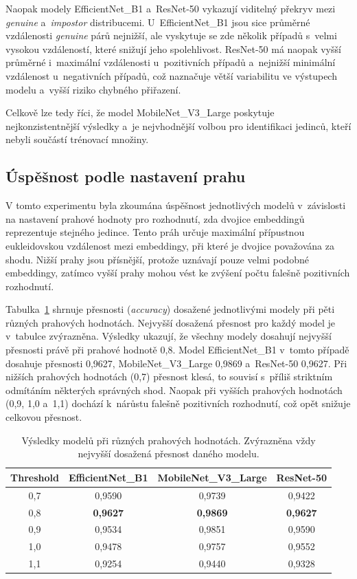 Naopak modely EfficientNet\_B1 a~ResNet-50 vykazují viditelný překryv mezi \textit{genuine} a~\textit{impostor} distribucemi. U~EfficientNet\_B1 jsou sice průměrné vzdálenosti \textit{genuine} párů nejnižší, ale vyskytuje se zde několik případů s~velmi vysokou vzdáleností, které snižují jeho spolehlivost. ResNet-50 má naopak vyšší průměrné i~maximální vzdálenosti u~pozitivních případů a~nejnižší minimální vzdálenost u~negativních případů, což naznačuje větší variabilitu ve výstupech modelu a~vyšší riziko chybného přiřazení.

Celkově lze tedy říci, že model MobileNet\_V3\_Large poskytuje nejkonzistentnější výsledky a~je nejvhodnější volbou pro identifikaci jedinců, kteří nebyli součástí trénovací množiny.

\subsection*{Úspěšnost podle nastavení prahu}

V tomto experimentu byla zkoumána úspěšnost jednotlivých modelů v~závislosti na nastavení prahové hodnoty pro rozhodnutí, zda dvojice embeddingů reprezentuje stejného jedince. Tento práh určuje maximální přípustnou eukleidovskou vzdálenost mezi embeddingy, při které je dvojice považována za shodu. Nižší prahy jsou přísnější, protože uznávají pouze velmi podobné embeddingy, zatímco vyšší prahy mohou vést ke zvýšení počtu falešně pozitivních rozhodnutí.

Tabulka~\ref{newCowAcc} shrnuje přesnosti (\textit{accuracy}) dosažené jednotlivými modely při pěti různých prahových hodnotách. Nejvyšší dosažená přesnost pro každý model je v~tabulce zvýrazněna. Výsledky ukazují, že všechny modely dosahují nejvyšší přesnosti právě při prahové hodnotě 0,8. Model EfficientNet\_B1 v~tomto případě dosahuje přesnosti 0,9627, MobileNet\_V3\_Large 0,9869 a~ResNet-50 0,9627. Při nižších prahových hodnotách (0,7) přesnost klesá, to souvisí s~příliš striktním odmítáním některých správných shod. Naopak při vyšších prahových hodnotách (0,9, 1,0 a~1,1) dochází k~nárůstu falešně pozitivních rozhodnutí, což opět snižuje celkovou přesnost.

\begin{table}[hbt]
	\centering
	\begin{tabular}{|c|c|c|c|}
		\hline
		\textbf{Threshold} & \textbf{EfficientNet\_B1} & \textbf{MobileNet\_V3\_Large} & \textbf{ResNet-50} \\ \hline
		0,7 & 0,9590 & 0,9739 & 0,9422 \\ \hline
		0,8 & \textbf{0,9627} & \textbf{0,9869} & \textbf{0,9627} \\ \hline
		0,9 & 0,9534 & 0,9851 & 0,9590 \\ \hline
		1,0 & 0,9478 & 0,9757 & 0,9552 \\ \hline
		1,1 & 0,9254 & 0,9440 & 0,9328 \\ \hline
	\end{tabular}
	\caption{Výsledky modelů při různých prahových hodnotách. Zvýrazněna vždy nejvyšší dosažená přesnost daného modelu.}
	\label{newCowAcc}
\end{table}

